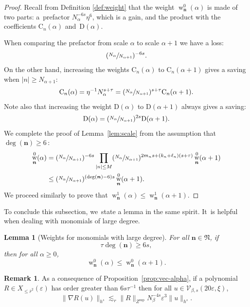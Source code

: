 \documentclass[JEP,XML,SOM,Unicode,published]{cedram}
\DeclareMathOperator{\rw}{w}
\theoremstyle{plain}
\newtheorem{lemma}[theorem]{Lemma}
\theoremstyle{definition}
\newtheorem{remark}[theorem]{Remark}
\newcommand{\nb}{{\boldsymbol n}}
\newcommand{\Nb}{{\boldsymbol{\mathfrak{N}}}}
\newcommand{\1}{\mathbf{1}}
\let\epsilon\varepsilon
\begin{document}
\begin{proof}
Recall from Definition \ref{def:weight} that the weight $\rw_{\nb}^{0}(\alpha)$ is made of two parts: a~prefactor $N_{\alpha}^{-6s}\eta^{6}$, which is a gain, and the product with the coefficients $\mathrm{C}_{n}(\alpha)$ and~$\mathrm{D}(\alpha)$.

When comparing the prefactor from scale $\alpha$ to scale $\alpha+1$ we have a loss:
\[
(\sfrac{N_{\alpha}}{N_{\alpha+1}})^{-6s}.
\]
On the other hand, increasing the weights $\mathrm{C}_{n}(\alpha)$ to $\mathrm{C}_{n}(\alpha+1)$ gives a saving when $|n|\geq N_{\alpha+1}$:
\[
\mathrm{C}_{n}(\alpha) = \eta^{-1}N_{\alpha}^{s+\tau} = (\sfrac{N_{\alpha}}{N_{\alpha+1}})^{s+\tau}\mathrm{C}_{n}(\alpha+1).
\]
Note also that increasing the weight $\mathrm{D}(\alpha)$ to $\mathrm{D}(\alpha+1)$ always gives a saving:
\[
\mathrm{D}(\alpha)
= (\sfrac{N_{\alpha}}{N_{\alpha+1}})^{2s} \mathrm{D}(\alpha+1).
\]
We complete the proof of Lemma~\ref{lem:scale} from the assumption that $\deg(\nb)\geq6$\,:
\begin{equation*}
\begin{split}
\rw_{\nb}^{0}(\alpha) &= (\sfrac{N_{\alpha}}{N_{\alpha+1}})^{-6s}\prod_{|n|\leq M}(\sfrac{N_{\alpha}}{N_{\alpha+1}})^{2m_{n}s+(k_{n}+\ell_{n})(s+\tau)}\rw_{\nb}^{0}(\alpha+1) \\
&\leq (\sfrac{N_{\alpha}}{N_{\alpha+1}})^{(\deg(\nb)-6)s} \rw_{\nb}^{0}(\alpha+1).
\end{split}
\end{equation*}
We proceed similarly to prove that $\rw_{\nb}^{1}(\alpha)
\leq \rw_{\nb}^{1}(\alpha+1)$.
\end{proof}

To conclude this subsection, we~state a lemma in the same spirit. It~is helpful when dealing with monomials of large degree.

\begin{lemma}[Weights for monomials with large degree]
\label{lem:deg}
For all $\nb\in\Nb$, if
\begin{equation}
\label{eq:par-tau}
\tau\deg(\nb)\geq 6s,
\end{equation}
then for all $\alpha\geq 0$,
\[
\rw_{\nb}^{0}(\alpha)\leq \rw_{\nb}^{0}(\alpha+1).
\]
\end{lemma}

\begin{remark}\label{rem:deg} As a consequence of Proposition~\ref{prop:vec-alpha}, if a polynomial $R\in X_{\leq\overline{r}^{2}}(\epsilon)$ has order greater than $6s\tau^{-1}$ then for all $u\in\mathcal{V}_{\beta,s}(20\epsilon,\xi)$,
\[
\|\nabla R(u)\|_{h^{s}}\lesssim_{r} \|R\|_{Z^{\mathrm{sup}}} N_{\beta}^{-4s}\epsilon^{3}\|u\|_{h^{s}}.
\]
\end{remark}
\end{document}
